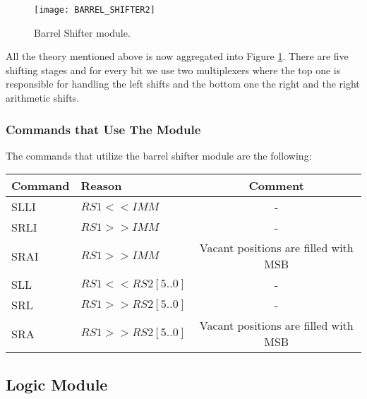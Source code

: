 	
	\begin{figure}[h!]
		\begin{center}
			\texttt{[image: BARREL\_SHIFTER2]}
			\caption{Barrel Shifter module.}
			\label{Image3.9}
		\end{center}
	\end{figure}

	All the theory mentioned above is now aggregated into Figure \ref{Image3.9}. There are five shifting stages and for every bit we use two multiplexers where the top one is responsible for handling the left shifts and the bottom one the right and the right arithmetic shifts. 
	
	\clearpage
	
	\subsubsection{Commands that Use The Module}
	
	The commands that utilize the barrel shifter module are the following:
	
	\vspace{2mm}
	\begin{threeparttable}[h!]
		
		\begin{tabular}{|l|l|c|} \hline
			\setrow{\bfseries}Command  &\setrow{\bfseries} Reason &\setrow{\bfseries} Comment \\\hline
			SLLI     & $RS1 << IMM$		    & -\\\hline
			SRLI     & $RS1 >> IMM$		    & -\\\hline
			SRAI     & $RS1 >> IMM$		    & Vacant positions are filled with MSB\\\hline
			SLL      & $RS1 << RS2[5..0]$   & -\\\hline
			SRL      & $RS1 >> RS2[5..0]$   & -\\\hline
			SRA 	 & $RS1 >> RS2[5..0]$   & Vacant positions are filled with MSB\\\hline
			
		\end{tabular}
		
		\label{Table 3.4}
		\vspace{3mm}
	\end{threeparttable}

	\subsection{\textcolor{burgundy}{Logic Module}}
	\label{SubSec3.3.4:LOG}
	
